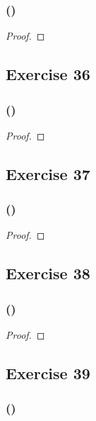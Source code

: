 \documentclass[14pt]{extarticle}
\begin{document}
\subsubsection{()}

\begin{proof}

\end{proof}

\subsection{Exercise 36}

\subsubsection{()}

\begin{proof}

\end{proof}

\subsection{Exercise 37}

\subsubsection{()}

\begin{proof}

\end{proof}

\subsection{Exercise 38}

\subsubsection{()}

\begin{proof}

\end{proof}

\subsection{Exercise 39}

\subsubsection{()}
\end{document}
